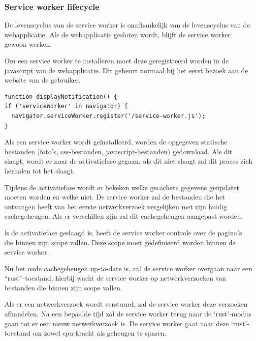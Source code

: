 \subsubsection{Service worker lifecycle }
De levenscyclus van de service worker is onafhankelijk van de levenscyclus van de webapplicatie. Als de webapplicatie gesloten wordt, blijft de service worker gewoon werken.

Om een service worker te installeren moet deze geregistreerd worden in de javascript van de webapplicatie. Dit gebeurt normaal bij het eerst bezoek aan de website van de gebruiker.

\begin{lstlisting}
function displayNotification() {
if ('serviceWorker' in navigator) {
  navigator.serviceWorker.register('/service-worker.js');
}

\end{lstlisting}

Als een service worker wordt geïnstalleerd, worden de opgegeven statische bestanden (foto’s, css-bestanden, javascript-bestanden) gedownload. Als dit slaagt, wordt er naar de activatiefase gegaan, als dit niet slaagt zal dit proces zich herhalen tot het slaagt. 

Tijdens de activatiefase wordt er bekeken welke gecachete gegevens geüpdatet moeten worden en welke niet. De service worker zal de bestanden die het ontvangen heeft van het eerste netwerkverzoek vergelijken met zijn huidig cachegeheugen. Als er verschillen zijn zal dit cachegeheugen aangepast worden.

ls de activatiefase geslaagd is, heeft de service worker controle over de pagina’s die binnen zijn scope vallen. Deze scope moet gedefinieerd worden binnen de service worker.

Nu het oude cachegeheugen up-to-date is, zal de service worker overgaan naar een “rust”-toestand, hierbij wacht de service worker op netwerkverzoeken van bestanden die binnen zijn scope vallen.

Als er een netwerkverzoek wordt verstuurd, zal de service worker deze verzoeken afhandelen. Na een bepaalde tijd zal de service worker terug naar de ‘rust’-modus gaan tot er een nieuw netwerkverzoek is. De service worker gaat naar deze ‘rust’-toestand om zowel cpu-kracht als geheugen te sparen.


\autocite{Gaunt2019}


